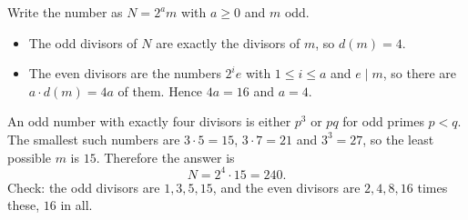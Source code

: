 Write the number as $N=2^am$ with $a\ge0$ and $m$ odd.
\begin{itemize}
\item The odd divisors of $N$ are exactly the divisors of $m$, so $d(m)=4$.
\item The even divisors are the numbers $2^ie$ with $1\le i\le a$ and $e\mid m$, so there are $a\cdot d(m)=4a$ of them. Hence $4a=16$ and $a=4$.
\end{itemize}
An odd number with exactly four divisors is either $p^3$ or $pq$ for odd primes $p<q$. The smallest such numbers are $3\cdot5=15$, $3\cdot7=21$ and $3^3=27$, so the least possible $m$ is $15$. Therefore the answer is
\[N=2^4\cdot15=\boxed{240}.\]
Check: the odd divisors are $1,3,5,15$, and the even divisors are $2,4,8,16$ times these, $16$ in all.
